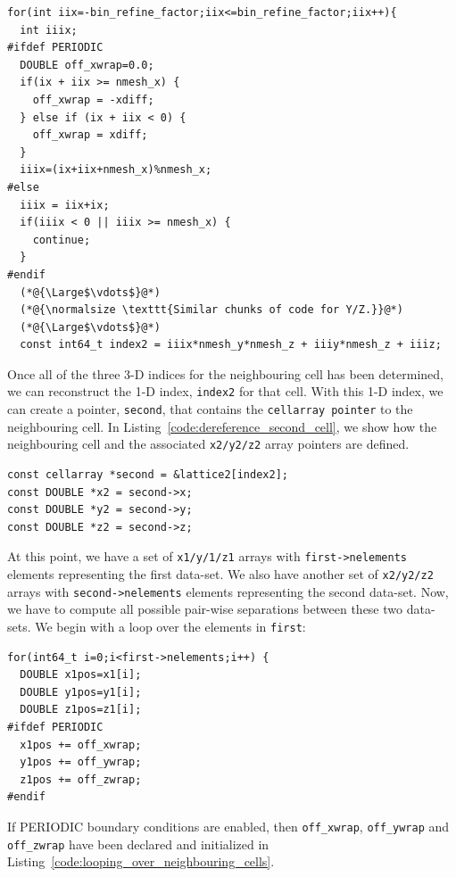 \documentclass[12pt,titlepage]{article}
\begin{document}
\begin{lstlisting}[label={code:looping_over_neighbouring_cells},caption={Looping over all the neighbouring cells and taking care of PERIODIC boundary conditions.}]
for(int iix=-bin_refine_factor;iix<=bin_refine_factor;iix++){
  int iiix;
#ifdef PERIODIC
  DOUBLE off_xwrap=0.0;
  if(ix + iix >= nmesh_x) {
    off_xwrap = -xdiff;
  } else if (ix + iix < 0) {
    off_xwrap = xdiff;
  }
  iiix=(ix+iix+nmesh_x)%nmesh_x;
#else
  iiix = iix+ix;
  if(iiix < 0 || iiix >= nmesh_x) {
    continue;
  }
#endif
  (*@{\Large$\vdots$}@*)
  (*@{\normalsize \texttt{Similar chunks of code for Y/Z.}}@*)
  (*@{\Large$\vdots$}@*)
  const int64_t index2 = iiix*nmesh_y*nmesh_z + iiiy*nmesh_z + iiiz;
\end{lstlisting}
Once all of the three 3-D indices for the neighbouring cell has been determined, we can reconstruct the 1-D index, \texttt{index2} for that cell. With this 1-D index, we can 
create a pointer, \texttt{second}, that contains the \texttt{cellarray pointer} to the neighbouring cell. In Listing~\ref{code:dereference_second_cell}, we show 
how the neighbouring cell and the associated \texttt{x2/y2/z2} array pointers are defined. 
\begin{lstlisting}[label={code:dereference_second_cell},caption={Dereferencing the pointers for the neighbouring (\texttt{second}) cell under consideration.}]
const cellarray *second = &lattice2[index2];
const DOUBLE *x2 = second->x;
const DOUBLE *y2 = second->y;
const DOUBLE *z2 = second->z;
\end{lstlisting}
At this point, we have a set of \texttt{x1/y/1/z1} arrays with \texttt{first->nelements} elements representing the first data-set. We also have another set of \texttt{x2/y2/z2} arrays with \texttt{second->nelements} 
elements representing the second data-set. Now, we have to compute all possible pair-wise separations between these two data-sets. We begin with a loop over the elements in 
\texttt{first}:
\begin{lstlisting}[label={code:looping_over_first_particles},caption={Looping over all particles in the \texttt{first} cell and accounting for PERIODIC boundary conditions.}]
for(int64_t i=0;i<first->nelements;i++) {
  DOUBLE x1pos=x1[i];
  DOUBLE y1pos=y1[i];
  DOUBLE z1pos=z1[i];
#ifdef PERIODIC
  x1pos += off_xwrap;
  y1pos += off_ywrap;
  z1pos += off_zwrap;
#endif
\end{lstlisting}
If PERIODIC boundary conditions are enabled, then \texttt{off\_xwrap}, \texttt{off\_ywrap} and \texttt{off\_zwrap} have been declared and initialized in Listing~\ref{code:looping_over_neighbouring_cells}.
\end{document}
